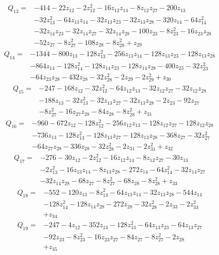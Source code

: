 \[\begin{aligned}Q_{13}={}&-414-22z_{12}-2z_{12}^{2}-16z_{12}z_{14}-8z_{12}z_{27}-200z_{13}
\\&-32z_{13}^{2}-64z_{13}z_{14}-32z_{13}z_{23}-32z_{13}z_{28}-320z_{14}-64z_{14}^{2}
\\&-32z_{14}z_{23}-32z_{14}z_{27}-32z_{14}z_{28}-100z_{23}-8z_{23}^{2}-16z_{23}z_{28}
\\&-52z_{27}-8z_{27}^{2}-108z_{28}-8z_{28}^{2}+z_{29}
\end{aligned}\]
\[\begin{aligned}Q_{14}={}&-1344-800z_{13}-128z_{13}^{2}-256z_{13}z_{14}-128z_{13}z_{23}-128z_{13}z_{28}
\\&-864z_{14}-128z_{14}^{2}-128z_{14}z_{23}-128z_{14}z_{28}-400z_{23}-32z_{23}^{2}
\\&-64z_{23}z_{28}-432z_{28}-32z_{28}^{2}-2z_{29}-2z_{29}^{2}+z_{30}
\end{aligned}\]
\[\begin{aligned}Q_{15}={}&-247-168z_{12}-32z_{12}^{2}-64z_{12}z_{13}-32z_{12}z_{27}-32z_{12}z_{28}
\\&-188z_{13}-32z_{13}^{2}-32z_{13}z_{27}-32z_{13}z_{28}-2z_{23}-92z_{27}
\\&-8z_{27}^{2}-16z_{27}z_{28}-84z_{28}-8z_{28}^{2}+z_{31}
\end{aligned}\]
\[\begin{aligned}Q_{16}={}&-960-672z_{12}-128z_{12}^{2}-256z_{12}z_{13}-128z_{12}z_{27}-128z_{12}z_{28}
\\&-736z_{13}-128z_{13}^{2}-128z_{13}z_{27}-128z_{13}z_{28}-368z_{27}-32z_{27}^{2}
\\&-64z_{27}z_{28}-336z_{28}-32z_{28}^{2}-2z_{31}-2z_{31}^{2}+z_{32}
\end{aligned}\]
\[\begin{aligned}Q_{17}={}&-276-30z_{12}-2z_{12}^{2}-16z_{12}z_{14}-8z_{12}z_{27}-30z_{13}
\\&-2z_{13}^{2}-16z_{13}z_{14}-8z_{13}z_{28}-272z_{14}-64z_{14}^{2}-32z_{14}z_{27}
\\&-32z_{14}z_{28}-68z_{27}-8z_{27}^{2}-68z_{28}-8z_{28}^{2}+z_{33}
\end{aligned}\]
\[\begin{aligned}Q_{18}={}&-552-120z_{13}-8z_{13}^{2}-64z_{13}z_{14}-32z_{13}z_{28}-544z_{14}
\\&-128z_{14}^{2}-128z_{14}z_{28}-272z_{28}-32z_{28}^{2}-2z_{33}-2z_{33}^{2}
\\&+z_{34}
\end{aligned}\]
\[\begin{aligned}Q_{19}={}&-247-4z_{12}-352z_{13}-128z_{13}^{2}-64z_{13}z_{23}-64z_{13}z_{27}
\\&-92z_{23}-8z_{23}^{2}-16z_{23}z_{27}-84z_{27}-8z_{27}^{2}-2z_{28}
\\&+z_{35}
\end{aligned}\]
